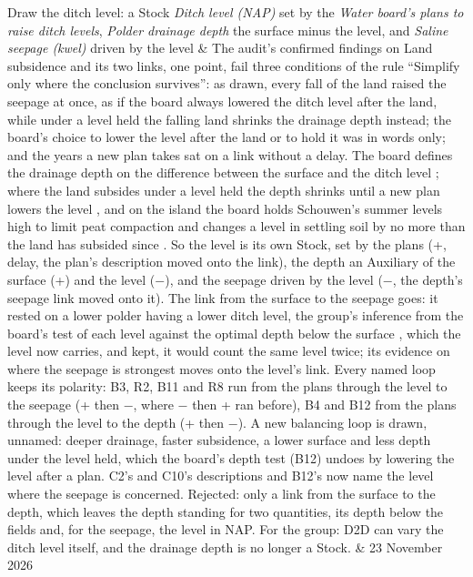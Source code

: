 Draw the ditch level: a Stock \emph{Ditch level (NAP)} set by the \emph{Water board's plans to raise ditch levels}, \emph{Polder drainage depth} the surface minus the level, and \emph{Saline seepage (kwel)} driven by the level & The audit's confirmed findings on Land subsidence and its two links, one point, fail three conditions of the rule “Simplify only where the conclusion survives”: as drawn, every fall of the land raised the seepage at once, as if the board always lowered the ditch level after the land, while under a level held the falling land shrinks the drainage depth instead; the board's choice to lower the level after the land or to hold it was in words only; and the years a new plan takes sat on a link without a delay. The board defines the drainage depth on the difference between the surface and the ditch level \parencite[p.~40]{scheldestromen-2021-hor-duiveland}; where the land subsides under a level held the depth shrinks until a new plan lowers the level \parencite[p.~13]{scheldestromen-2025-nota-peilbesluiten}, and on the island the board holds Schouwen's summer levels high to limit peat compaction and changes a level in settling soil by no more than the land has subsided since \parencite[pp.~45, 50]{scheldestromen-2021-hor-schouwen}. So the level is its own Stock, set by the plans (+, delay, the plan's description moved onto the link), the depth an Auxiliary of the surface (+) and the level ($-$), and the seepage driven by the level ($-$, the depth's seepage link moved onto it). The link from the surface to the seepage goes: it rested on a lower polder having a lower ditch level, the group's inference from the board's test of each level against the optimal depth below the surface \parencite[p.~40]{scheldestromen-2021-hor-duiveland}, which the level now carries, and kept, it would count the same level twice; its evidence on where the seepage is strongest moves onto the level's link. Every named loop keeps its polarity: B3, R2, B11 and R8 run from the plans through the level to the seepage (+ then $-$, where $-$ then + ran before), B4 and B12 from the plans through the level to the depth (+ then $-$). A new balancing loop is drawn, unnamed: deeper drainage, faster subsidence, a lower surface and less depth under the level held, which the board's depth test (B12) undoes by lowering the level after a plan. C2's and C10's descriptions and B12's now name the level where the seepage is concerned. Rejected: only a link from the surface to the depth, which leaves the depth standing for two quantities, its depth below the fields and, for the seepage, the level in NAP. For the group: D2D can vary the ditch level itself, and the drainage depth is no longer a Stock. & 23 November 2026 \\
